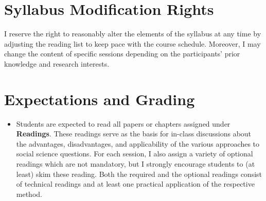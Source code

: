 \documentclass[abstract=on,parskip=full,headings=standardclasses,fontsize=11pt,paper=a4]{scrartcl}
\begin{document}
\section*{Syllabus Modification Rights}

I reserve the right to reasonably alter the elements of the syllabus at any time by adjusting the reading list to keep pace with the course schedule. Moreover, I may change the content of specific sessions depending on the participants' prior knowledge and research interests.


\section*{Expectations and Grading}


\begin{itemize}
\item Students are expected to read all papers or chapters assigned under \textbf{Readings}. These readings serve as the basis for in-class discussions about the advantages, disadvantages, and applicability of the various approaches to social science questions. For each session, I also assign a variety of optional readings which are not mandatory, but I strongly encourage students to (at least) skim these reading. Both the required  and the optional readings consist of technical  readings and at least one practical application of the respective method.

\end{itemize}
\end{document}

